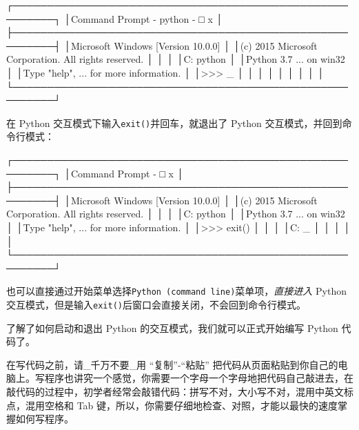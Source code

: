 \begin{pythoncode}
┌────────────────────────────────────────────────────────┐
│Command Prompt - python                           - □ x │
├────────────────────────────────────────────────────────┤
│Microsoft Windows [Version 10.0.0]                      │
│(c) 2015 Microsoft Corporation. All rights reserved.    │
│                                                        │
│C:\> python                                             │
│Python 3.7 ... on win32                                 │
│Type "help", ... for more information.                  │
│>>> _                                                   │
│                                                        │
│                                                        │
│                                                        │
│                                                        │
└────────────────────────────────────────────────────────┘
\end{pythoncode}

在 Python 交互模式下输入\texttt{exit()}并回车，就退出了 Python
交互模式，并回到命令行模式：

\begin{pythoncode}
┌────────────────────────────────────────────────────────┐
│Command Prompt                                    - □ x │
├────────────────────────────────────────────────────────┤
│Microsoft Windows [Version 10.0.0]                      │
│(c) 2015 Microsoft Corporation. All rights reserved.    │
│                                                        │
│C:\> python                                             │
│Python 3.7 ... on win32                                 │
│Type "help", ... for more information.                  │
│>>> exit()                                              │
│                                                        │
│C:\> _                                                  │
│                                                        │
│                                                        │
└────────────────────────────────────────────────────────┘
\end{pythoncode}

也可以直接通过开始菜单选择\texttt{Python\ (command\ line)}菜单项，\emph{直接进入}
Python
交互模式，但是输入\texttt{exit()}后窗口会直接关闭，不会回到命令行模式。

了解了如何启动和退出 Python 的交互模式，我们就可以正式开始编写 Python
代码了。

在写代码之前，请\_千万不要\_用 ``复制''-``粘贴''
把代码从页面粘贴到你自己的电脑上。写程序也讲究一个感觉，你需要一个字母一个字母地把代码自己敲进去，在敲代码的过程中，初学者经常会敲错代码：拼写不对，大小写不对，混用中英文标点，混用空格和
Tab 键，所以，你需要仔细地检查、对照，才能以最快的速度掌握如何写程序。

